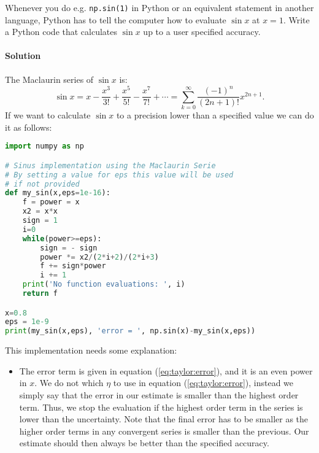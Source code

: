 \documentclass[graybox,sectrefs,envcountresetchap,open=right,final]{svmonodo}
\newenvironment{graybox2admon}[1][]{
\begin{graybox2mdframed}[frametitle=#1]
}
{
\end{graybox2mdframed}
}
\begin{document}
\begin{graybox2admon}[Example: evaluate $\sin x$]
Whenever you do e.g. \texttt{np.sin(1)} in Python or an equivalent statement in another language, Python has to tell the computer how to evaluate $\sin x$ at $x=1$. Write a Python code that calculates $\sin x$ up to a user specified accuracy.

\paragraph{Solution}
The Maclaurin series of $\sin x$ is:
\begin{equation}
\sin x = x-\frac{x^3}{3!}+\frac{x^5}{5!}-\frac{x^7}{7!}+\cdots=\sum_{k=0}^{\infty}\frac{(-1)^n}{(2n+1)!}x^{2n+1}.
\label{sin}
\end{equation}
If we want to calculate $\sin x$ to a precision lower than a specified value we can do it as follows:























\begin{lstlisting}[language=python,style=blue1bar]
import numpy as np

# Sinus implementation using the Maclaurin Serie
# By setting a value for eps this value will be used
# if not provided
def my_sin(x,eps=1e-16):
    f = power = x
    x2 = x*x
    sign = 1
    i=0
    while(power>=eps):
        sign = - sign
        power *= x2/(2*i+2)/(2*i+3)
        f += sign*power
        i += 1
    print('No function evaluations: ', i)
    return f

x=0.8
eps = 1e-9
print(my_sin(x,eps), 'error = ', np.sin(x)-my_sin(x,eps))

\end{lstlisting}


This implementation needs some explanation:

\begin{itemize}
\item The error term is given in equation (\ref{eq:taylor:error}), and it is an even power in $x$. We do not which $\eta$ to use in equation (\ref{eq:taylor:error}), instead we simply say that the error in our estimate is smaller than the highest order term. Thus, we stop the evaluation if the highest order term in the series is lower than the uncertainty. Note that the final error has to be smaller as the higher order terms in any convergent series is smaller than the previous.  Our estimate should then always be better than the specified accuracy.


\end{itemize}
\end{graybox2admon}
\end{document}
